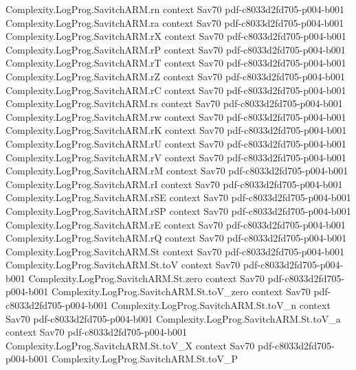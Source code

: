 \begin{theorem}
  {Complexity.LogProg.SavitchARM.rn}
  {context}
  {Sav70}
  {pdf-c8033d2fd705-p004-b001}
\proofstep
  {Complexity.LogProg.SavitchARM.ra}
  {context}
  {Sav70}
  {pdf-c8033d2fd705-p004-b001}
\proofstep
  {Complexity.LogProg.SavitchARM.rX}
  {context}
  {Sav70}
  {pdf-c8033d2fd705-p004-b001}
\proofstep
  {Complexity.LogProg.SavitchARM.rP}
  {context}
  {Sav70}
  {pdf-c8033d2fd705-p004-b001}
\proofstep
  {Complexity.LogProg.SavitchARM.rT}
  {context}
  {Sav70}
  {pdf-c8033d2fd705-p004-b001}
\proofstep
  {Complexity.LogProg.SavitchARM.rZ}
  {context}
  {Sav70}
  {pdf-c8033d2fd705-p004-b001}
\proofstep
  {Complexity.LogProg.SavitchARM.rC}
  {context}
  {Sav70}
  {pdf-c8033d2fd705-p004-b001}
\proofstep
  {Complexity.LogProg.SavitchARM.rs}
  {context}
  {Sav70}
  {pdf-c8033d2fd705-p004-b001}
\proofstep
  {Complexity.LogProg.SavitchARM.rw}
  {context}
  {Sav70}
  {pdf-c8033d2fd705-p004-b001}
\proofstep
  {Complexity.LogProg.SavitchARM.rK}
  {context}
  {Sav70}
  {pdf-c8033d2fd705-p004-b001}
\proofstep
  {Complexity.LogProg.SavitchARM.rU}
  {context}
  {Sav70}
  {pdf-c8033d2fd705-p004-b001}
\proofstep
  {Complexity.LogProg.SavitchARM.rV}
  {context}
  {Sav70}
  {pdf-c8033d2fd705-p004-b001}
\proofstep
  {Complexity.LogProg.SavitchARM.rM}
  {context}
  {Sav70}
  {pdf-c8033d2fd705-p004-b001}
\proofstep
  {Complexity.LogProg.SavitchARM.rI}
  {context}
  {Sav70}
  {pdf-c8033d2fd705-p004-b001}
\proofstep
  {Complexity.LogProg.SavitchARM.rSE}
  {context}
  {Sav70}
  {pdf-c8033d2fd705-p004-b001}
\proofstep
  {Complexity.LogProg.SavitchARM.rSP}
  {context}
  {Sav70}
  {pdf-c8033d2fd705-p004-b001}
\proofstep
  {Complexity.LogProg.SavitchARM.rE}
  {context}
  {Sav70}
  {pdf-c8033d2fd705-p004-b001}
\proofstep
  {Complexity.LogProg.SavitchARM.rQ}
  {context}
  {Sav70}
  {pdf-c8033d2fd705-p004-b001}
\proofstep
  {Complexity.LogProg.SavitchARM.St}
  {context}
  {Sav70}
  {pdf-c8033d2fd705-p004-b001}
\proofstep
  {Complexity.LogProg.SavitchARM.St.toV}
  {context}
  {Sav70}
  {pdf-c8033d2fd705-p004-b001}
\proofstep
  {Complexity.LogProg.SavitchARM.St.zero}
  {context}
  {Sav70}
  {pdf-c8033d2fd705-p004-b001}
\proofstep
  {Complexity.LogProg.SavitchARM.St.toV_zero}
  {context}
  {Sav70}
  {pdf-c8033d2fd705-p004-b001}
\proofstep
  {Complexity.LogProg.SavitchARM.St.toV_n}
  {context}
  {Sav70}
  {pdf-c8033d2fd705-p004-b001}
\proofstep
  {Complexity.LogProg.SavitchARM.St.toV_a}
  {context}
  {Sav70}
  {pdf-c8033d2fd705-p004-b001}
\proofstep
  {Complexity.LogProg.SavitchARM.St.toV_X}
  {context}
  {Sav70}
  {pdf-c8033d2fd705-p004-b001}
\proofstep
  {Complexity.LogProg.SavitchARM.St.toV_P}

\end{theorem}
